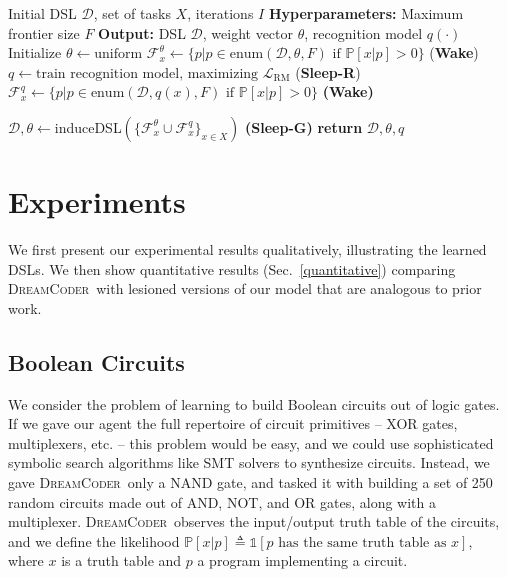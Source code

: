 \documentclass{article}
\newcommand{\system}{\textsc{DreamCoder}~}
\newcommand{\indicator}{\mathds{1}} %
\newcommand{\probability}{\mathds{P}} %
\begin{document}
\begin{algorithm}[tb]
   \caption{The \system Algorithm}
   \label{mainAlgorithm}
   \begin{algorithmic}
      Initial DSL $\mathcal{D}$, set of tasks $X$, iterations $I$
     \STATE \textbf{Hyperparameters:} Maximum frontier size $F$
     \STATE \textbf{Output:} DSL $\mathcal{D}$, weight vector $\theta$, recognition model $q(\cdot)$
     \STATE Initialize $\theta\gets \text{uniform}$ %
     \STATE  $\mathcal{F}^{\theta}_x\gets \{p| p\in \text{enum}(\mathcal{D},\theta,F)\text{ if }\probability[x|p] > 0\}$ \footnotesize{(\textbf{Wake})}
     \STATE $q\gets \text{train recognition model, maximizing }\mathcal{L}_{\text{RM}}$ (\footnotesize{\textbf{Sleep-R}})
     \STATE  $\mathcal{F}^{q}_x\gets\{p|p\in \text{enum}(\mathcal{D},q(x),F)\text{ if }\probability[x|p] > 0\}$ \footnotesize{\textbf{(Wake)}}
     
     \STATE $\mathcal{D},\theta\gets $induceDSL$(\{\mathcal{F}^{\theta}_x\cup\mathcal{F}^{q}_x\}_{x\in X})$  \hspace{1.1cm} \footnotesize{\textbf{(Sleep-G)}}
      \ENDFOR
 \STATE \textbf{return} $\mathcal{D},\theta,q$
\end{algorithmic}
\end{algorithm}


\section{Experiments}
We first present our experimental results qualitatively,
illustrating the learned DSLs.
We then show quantitative results (Sec.~\ref{quantitative})
comparing \system with lesioned versions
of our model that are analogous to prior work.

\subsection{Boolean Circuits}
We consider the problem of learning
to build  Boolean circuits out of logic gates.
If we gave our agent the full repertoire of
circuit primitives -- XOR gates, multiplexers, etc. -- this problem would be easy,
and we could use sophisticated symbolic search algorithms like SMT solvers to synthesize circuits.
Instead, we gave \system only a NAND gate,
and tasked it with building a set of 250 random circuits made out of
AND, NOT, and OR gates, along with a multiplexer.
\system observes the input/output truth table of the circuits,
and we define the likelihood 
$  \probability[x|p]\triangleq\indicator\left[p\text{ has  the same truth table as }x \right]$,
where $x$ is a truth table and $p$ a program implementing a circuit.
\end{document}
